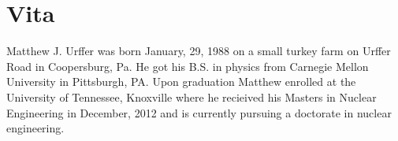 \chapter*{Vita} \label{ch:vita}
Matthew J. Urffer was born January, 29, 1988 on a small turkey farm on Urffer Road in Coopersburg, Pa.
He got his B.S. in physics from Carnegie Mellon University in Pittsburgh, PA. 
Upon graduation Matthew enrolled at the University of Tennessee, Knoxville where he recieived his Masters in Nuclear Engineering in December, 2012 and is currently pursuing a doctorate in nuclear engineering.
